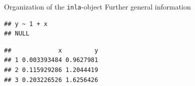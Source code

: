 \documentclass[
  ignorenonframetext,
]{beamer}
\newenvironment{Shaded}{\begin{snugshade}}{\end{snugshade}}
\newcommand{\CommentTok}[1]{\textcolor[rgb]{0.56,0.35,0.01}{\textit{#1}}}
\newcommand{\DecValTok}[1]{\textcolor[rgb]{0.00,0.00,0.81}{#1}}
\newcommand{\NormalTok}[1]{#1}
\newcommand{\SpecialCharTok}[1]{\textcolor[rgb]{0.00,0.00,0.00}{#1}}
\begin{document}
\begin{frame}[fragile]{Organization of the \texttt{inla}-object}
\protect\hypertarget{organization-of-the-inla-object-3}{}
Further general information

\begin{Shaded}
\end{Shaded}

\begin{verbatim}
## y ~ 1 + x
## NULL
\end{verbatim}

\begin{Shaded}
\end{Shaded}

\begin{verbatim}
##             x         y
## 1 0.003393484 0.9627981
## 2 0.115929286 1.2044419
## 3 0.203226526 1.6256426
\end{verbatim}

\begin{Shaded}
\end{Shaded}
\end{frame}
\end{document}
